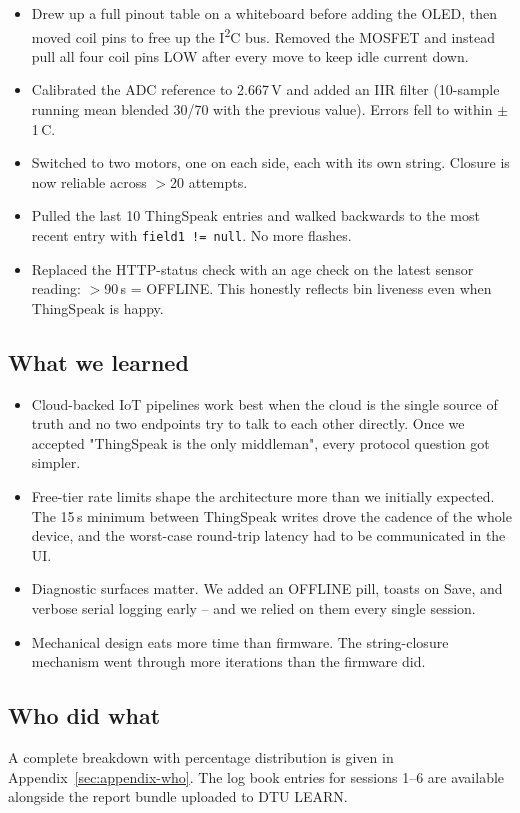 \documentclass{article}
\begin{document}
\begin{itemize}
    \item Drew up a full pinout table on a whiteboard before adding the OLED, then moved coil pins to free up the I\textsuperscript{2}C bus. Removed the MOSFET and instead pull all four coil pins LOW after every move to keep idle current down.
    \item Calibrated the ADC reference to 2.667\,V and added an IIR filter (10-sample running mean blended 30/70 with the previous value). Errors fell to within $\pm$1\,\textdegree C.
    \item Switched to two motors, one on each side, each with its own string. Closure is now reliable across $>$20 attempts.
    \item Pulled the last 10 ThingSpeak entries and walked backwards to the most recent entry with \texttt{field1 != null}. No more flashes.
    \item Replaced the HTTP-status check with an age check on the latest sensor reading: $>$90\,s = OFFLINE. This honestly reflects bin liveness even when ThingSpeak is happy.
\end{itemize}

\subsection{What we learned}
\label{sec:reflection-learned}

\begin{itemize}
    \item Cloud-backed IoT pipelines work best when the cloud is the single source of truth and no two endpoints try to talk to each other directly. Once we accepted "ThingSpeak is the only middleman", every protocol question got simpler.
    \item Free-tier rate limits shape the architecture more than we initially expected. The 15\,s minimum between ThingSpeak writes drove the cadence of the whole device, and the worst-case round-trip latency had to be communicated in the UI.
    \item Diagnostic surfaces matter. We added an OFFLINE pill, toasts on Save, and verbose serial logging early -- and we relied on them every single session.
    \item Mechanical design eats more time than firmware. The string-closure mechanism went through more iterations than the firmware did.
\end{itemize}

\subsection{Who did what}
\label{sec:reflection-who}

A complete breakdown with percentage distribution is given in Appendix~\ref{sec:appendix-who}. The log book entries for sessions 1--6 are available alongside the report bundle uploaded to DTU LEARN.

\ifdefined\mainfile\else
\end{document}
